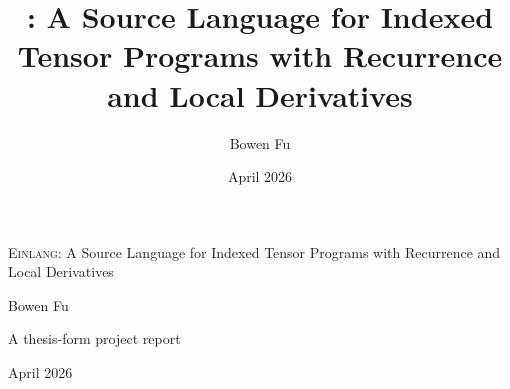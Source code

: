 \documentclass[12pt,oneside]{report}
\title{\einlang{}: A Source Language for Indexed Tensor Programs with Recurrence and Local Derivatives}
\author{Bowen Fu}
\date{April 2026}
\newcommand{\einlang}{\textsc{Einlang}}
\begin{document}
\hypersetup{pageanchor=false}
\begin{titlepage}
\centering
\vspace*{1.0in}
{\Large \einlang{}: A Source Language for Indexed Tensor Programs with Recurrence and Local Derivatives\par}
\vspace{0.75in}
{\large Bowen Fu\par}
\vfill
{\large A thesis-form project report\par}
\vspace{0.3in}
{\large April 2026\par}
\end{titlepage}
\clearpage
\hypersetup{pageanchor=true}




\cleardoublepage
{}
{}
\tableofcontents
\clearpage
{}














\end{document}
